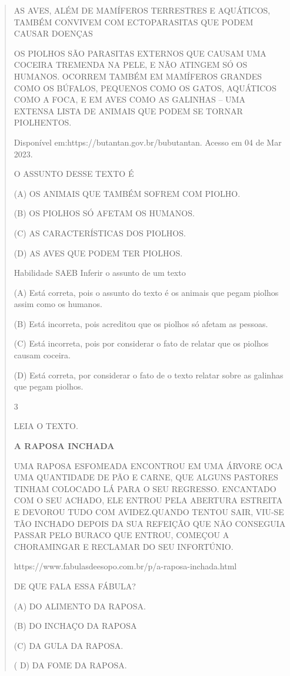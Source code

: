 {{{{\begin{verse}
{{\begin{escolha}
{{{{AS AVES, ALÉM DE MAMÍFEROS TERRESTRES E AQUÁTICOS, TAMBÉM CONVIVEM COM
ECTOPARASITAS QUE PODEM CAUSAR DOENÇAS

OS PIOLHOS SÃO PARASITAS EXTERNOS QUE CAUSAM UMA COCEIRA TREMENDA NA
PELE, E NÃO ATINGEM SÓ OS HUMANOS. OCORREM TAMBÉM EM MAMÍFEROS GRANDES
COMO OS BÚFALOS, PEQUENOS COMO OS GATOS, AQUÁTICOS COMO A FOCA, E EM
AVES COMO AS GALINHAS -- UMA EXTENSA LISTA DE ANIMAIS QUE PODEM SE
TORNAR PIOLHENTOS.

Disponível em:https://butantan.gov.br/bubutantan. Acesso em 04 de Mar
2023.

O ASSUNTO DESSE TEXTO É

(A) OS ANIMAIS QUE TAMBÉM SOFREM COM PIOLHO.

(B) OS PIOLHOS SÓ AFETAM OS HUMANOS.

(C) AS CARACTERÍSTICAS DOS PIOLHOS.

(D) AS AVES QUE PODEM TER PIOLHOS.

Habilidade SAEB Inferir o assunto de um texto

(A) Está correta, pois o assunto do texto é os animais que pegam piolhos
assim como os humanos.

(B) Está incorreta, pois acreditou que os piolhos só afetam as pessoas.

(C) Está incorreta, pois por considerar o fato de relatar que os piolhos
causam coceira.

(D) Está correta, por considerar o fato de o texto relatar sobre as
galinhas que pegam piolhos.

\num{3}

LEIA O TEXTO.

\textbf{A RAPOSA INCHADA}

UMA RAPOSA ESFOMEADA ENCONTROU EM UMA ÁRVORE OCA UMA QUANTIDADE DE PÃO E
CARNE, QUE ALGUNS PASTORES TINHAM COLOCADO LÁ PARA O SEU REGRESSO.
ENCANTADO COM O SEU ACHADO, ELE ENTROU PELA ABERTURA ESTREITA E DEVOROU
TUDO COM AVIDEZ.QUANDO TENTOU SAIR, VIU-SE TÃO INCHADO DEPOIS DA SUA
REFEIÇÃO QUE NÃO CONSEGUIA PASSAR PELO BURACO QUE ENTROU, COMEÇOU A
CHORAMINGAR E RECLAMAR DO SEU INFORTÚNIO.

https://www.fabulasdeesopo.com.br/p/a-raposa-inchada.html

DE QUE FALA ESSA FÁBULA?

(A) DO ALIMENTO DA RAPOSA.

(B) DO INCHAÇO DA RAPOSA

(C) DA GULA DA RAPOSA.

( D) DA FOME DA RAPOSA.

}}}}
\end{escolha}}}
\end{verse}}}}}

